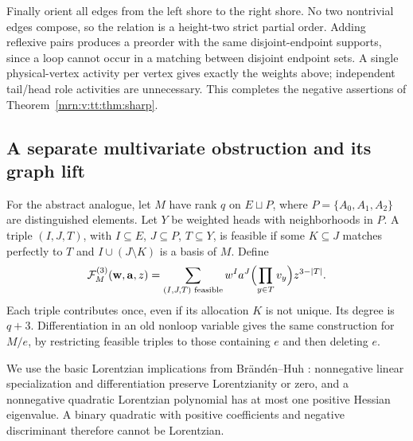 \documentclass[11pt,a4paper]{article}
\theoremstyle{remark}\newtheorem{remark}[theorem]{Remark}
\begin{document}
Finally orient all edges from the left shore to the right shore. No two nontrivial edges compose, so the relation is a height-two strict partial order. Adding reflexive pairs produces a preorder with the same disjoint-endpoint supports, since a loop cannot occur in a matching between disjoint endpoint sets. A single physical-vertex activity per vertex gives exactly the weights above; independent tail/head role activities are unnecessary. This completes the negative assertions of Theorem~\ref{mrn:v:tt:thm:sharp}.

\subsection{A separate multivariate obstruction and its graph lift}
For the abstract analogue, let $M$ have rank $q$ on $E\sqcup P$, where $P=\{A_0,A_1,A_2\}$ are distinguished elements. Let $Y$ be weighted heads with neighborhoods in $P$. A triple $(I,J,T)$, with $I\subseteq E$, $J\subseteq P$, $T\subseteq Y$, is feasible if some $K\subseteq J$ matches perfectly to $T$ and $I\cup(J\setminus K)$ is a basis of $M$. Define
\begin{equation}\label{mrn:v:tt:eq:transform}
 \mathcal F_M^{(3)}(\mathbf w,\mathbf a,z)
 =\sum_{(I,J,T)\text{ feasible}}w^I a^J
       \Bigl(\prod_{y\in T}v_y\Bigr)z^{3-|T|}.
\end{equation}
Each triple contributes once, even if its allocation $K$ is not unique. Its degree is $q+3$. Differentiation in an old nonloop variable gives the same construction for $M/e$, by restricting feasible triples to those containing $e$ and then deleting $e$.

We use the basic Lorentzian implications from Br\"and\'en--Huh \cite[Theorems 2.10 and 2.25]{b:BH}: nonnegative linear specialization and differentiation preserve Lorentzianity or zero, and a nonnegative quadratic Lorentzian polynomial has at most one positive Hessian eigenvalue. A binary quadratic with positive coefficients and negative discriminant therefore cannot be Lorentzian.
\end{document}
